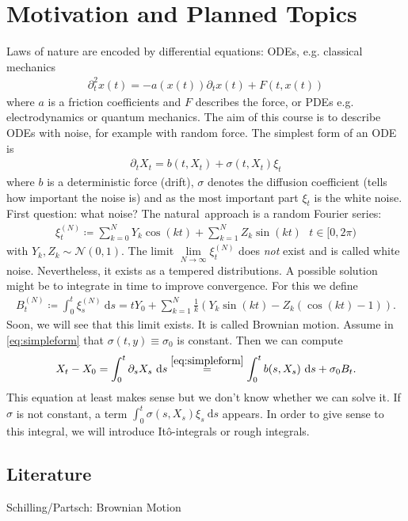 \chapter{Motivation and Planned Topics}
Laws of nature are encoded by differential equations: ODEs, e.g. classical mechanics 
\begin{align*}
\partial_t^2 x(t)=-a(x(t))\partial_t x(t)+F(t,x(t))
\end{align*}
where $a$ is a friction coefficients and $F$ describes the force,
or PDEs e.g. electrodynamics or quantum mechanics.
The aim of this course is to describe ODEs with noise, for example with random force.
The simplest form of an ODE is
\begin{align}\label{eq:simpleform}
\partial_t X_t=b(t,X_t)+\sigma(t,X_t)\xi_t
\end{align}
where $b$ is a deterministic force (drift), $\sigma$ denotes the diffusion coefficient (tells how important the noise is) and as the most important part
$\xi_t$ is the white noise.
First question: what noise?
The \glqq natural\grqq\, approach is a random Fourier series:
\begin{align}
\xi_t^{(N)}\coloneqq \sum_{k=0}^N Y_k \cos(kt)+ \sum_{k=1}^N Z_k \sin(kt)~~~t\in [0,2\pi)
\end{align}
with $Y_k,Z_k \sim \mathcal{N}(0,1)$.
The limit $\lim\limits_{N\to \infty} \xi_t^{(N)}$ does \emph{not} exist and is called \glqq white noise\grqq.
Nevertheless, it exists as a tempered distributions.
A possible solution might be to integrate in time to improve convergence. For this we define
\begin{align}
B_t^{(N)}\coloneqq \int_0^t\xi_s^{(N)}~\mathrm{d}s=tY_0+\sum_{k=1}^N \frac{1}{k}(Y_k\sin(kt)-Z_k(\cos(kt)-1)).
\end{align}
Soon, we will see that this limit exists. It is called \glqq Brownian motion\grqq.
Assume in \eqref{eq:simpleform} that $\sigma(t,y)\equiv \sigma_0$ is constant. Then we can compute
\begin{align*}
X_t-X_0=\int_0^t \partial_s X_s~\mathrm{d}s\overset{\eqref{eq:simpleform}}{=}\int_0^t b(s,X_s)~\mathrm{d}s+\sigma_0 B_t.
\end{align*}
This equation at least makes sense but we don't know whether we can solve it.
If $\sigma$ is not constant, a term $\int_0^t\sigma(s,X_s)\xi_s~\mathrm{d}s$ appears.
In order to give sense to this integral, we will introduce It\^o-integrals or rough integrals.

\section*{Literature}
Schilling/Partsch: \glqq Brownian Motion\grqq
